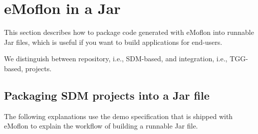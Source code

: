 \newpage
\chapter{eMoflon in a Jar}
\genHeader

This section describes how to package code generated with eMoflon into
runnable Jar files, which is useful if you want to build applications for end-users.

We distinguish between repository, i.e., SDM-based, and integration,
i.e., TGG-based, projects.

\section{Packaging SDM projects into a Jar file}

The following explanations use the demo specification that is shipped with
eMoflon to explain the workflow of building a runnable Jar file.

